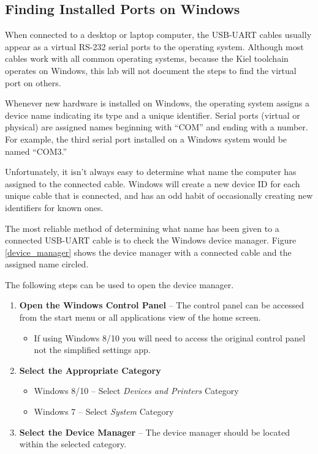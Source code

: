\documentclass[11pt,fleqn]{book} %
\begin{document}
\subsection{Finding Installed Ports on Windows}
When connected to a desktop or laptop computer, the USB-UART cables usually appear as a virtual RS-232 serial ports to the operating system. Although most cables work with all common operating systems, because the Kiel toolchain operates on Windows, this lab will not document the steps to find the virtual port on others. 

Whenever new hardware is installed on Windows, the operating system assigns a device name indicating its type and a unique identifier. Serial ports (virtual or physical) are assigned names beginning with ``COM'' and ending with a number. For example, the third serial port installed on a Windows system would be named ``COM3.''

Unfortunately, it isn't always easy to determine what name the computer has assigned to the connected cable. Windows will create a new device ID for each unique cable that is connected, and has an odd habit of occasionally creating new identifiers for known ones. 

The most reliable method of determining what name has been given to a connected USB-UART cable is to check the Windows device manager. Figure \ref{device_manager} shows the device manager with a connected cable and the assigned name circled. 

The following steps can be used to open the device manager.

\begin{enumerate}
    \item \textbf{Open the Windows Control Panel} -- The control panel can be accessed from the start menu or all applications view of the home screen.
        \begin{itemize}
            \item If using Windows 8/10 you will need to access the original control panel not the simplified settings app.
        \end{itemize} 
    \item \textbf{Select the Appropriate Category}
     \begin{itemize}
        \item Windows 8/10 -- Select \textit{Devices and Printers} Category
        \item Windows 7 -- Select \textit{System} Category
    \end{itemize} 
    \item \textbf{Select the Device Manager} -- The device manager should be located within the selected category.
\end{enumerate}
\end{document}
